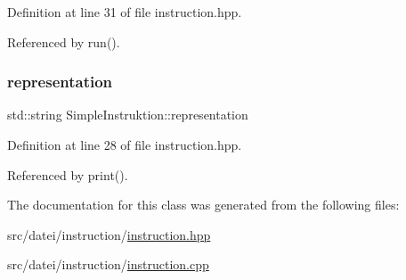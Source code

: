 Definition at line 31 of file instruction.\+hpp.



Referenced by run().

\mbox{\label{class_simple_instruktion_a1e2b7a4f9d38ec973e030062570c4fe2}} 
\subsubsection{\texorpdfstring{representation}{representation}}
{\footnotesize\ttfamily std\+::string Simple\+Instruktion\+::representation\hspace{0.3cm}{\ttfamily [private]}}



Definition at line 28 of file instruction.\+hpp.



Referenced by print().



The documentation for this class was generated from the following files\+:\begin{DoxyCompactItemize}
\item 
src/datei/instruction/\mbox{\hyperlink{instruction_8hpp}{instruction.\+hpp}}\item 
src/datei/instruction/\mbox{\hyperlink{instruction_8cpp}{instruction.\+cpp}}\end{DoxyCompactItemize}
